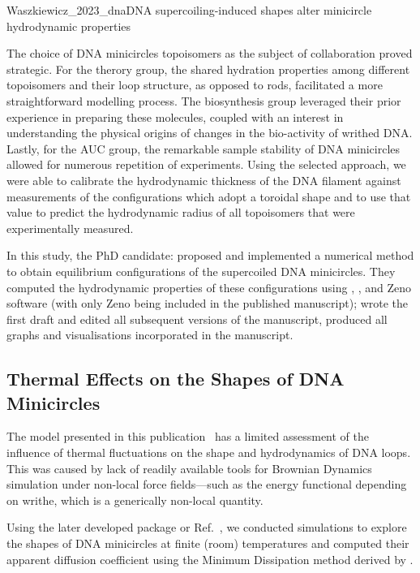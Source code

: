 \documentclass[physics]{doctoral}
\newcommand{\code}[1]{\texttt{\detokenize{#1}}}
\begin{document}
\begin{publicationpage}{Waszkiewicz_2023_dna}{DNA supercoiling-induced shapes alter minicircle hydrodynamic properties}
{        The choice of DNA minicircles topoisomers as the subject of collaboration proved strategic.
        For the therory group, the shared hydration properties among different topoisomers and their loop structure, as opposed to rods, facilitated a more straightforward modelling process.
        The biosynthesis group leveraged their prior experience in preparing these molecules, coupled with an interest in understanding the physical origins of changes in the bio-activity of writhed DNA.
        Lastly, for the AUC group, the remarkable sample stability of DNA minicircles allowed for numerous repetition of experiments.
        Using the selected approach, we were able to calibrate the hydrodynamic thickness of the DNA filament against measurements of the configurations which adopt a toroidal shape and to use that value to predict the hydrodynamic radius of all topoisomers that were experimentally measured.

        In this study, the PhD candidate: proposed and implemented a numerical method to obtain equilibrium configurations of the supercoiled DNA minicircles.
        They computed the hydrodynamic properties of these configurations using \code{GRPY}, \code{pygrpy}, and Zeno software (with only Zeno being included in the published manuscript); wrote the first draft and edited all subsequent versions of the manuscript, produced all graphs and visualisations incorporated in the manuscript.
    }
\end{publicationpage}


\subsection{Thermal Effects on the Shapes of DNA Minicircles}

The model presented in this publication~\cite{Waszkiewicz_2023_dna} has a limited assessment of the influence of thermal fluctuations on the shape and hydrodynamics of DNA loops.
This was caused by lack of readily available tools for Brownian Dynamics simulation under non-local force fields---such as the energy functional depending on writhe, which is a generically non-local quantity.

Using the later developed \code{pychastic} package or Ref.~\cite{Waszkiewicz_2023_pychastic}, we conducted simulations to explore the shapes of DNA minicircles at finite (room) temperatures and computed their apparent diffusion coefficient using the Minimum Dissipation method derived by \textcite{Cichocki_2019}.
\end{document}
